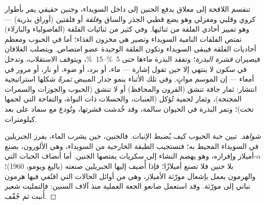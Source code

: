 \begin{definition}\label{def:b2:angiosperm-reproduction:seed}
تنقسم اللاقحة إلى معلاق يدفع الجنين إلى داخل السويداء، وجنين حقيقي
يمر بأطوار كروي وقلبي ومغزلي وهو يضع قطبي الجذر والساق و\emph{فلقة}
أو فلقتين (أوراق بذرية) --- وهو تمييز أحادي الفلقة من ثنائيها. وفي
كثير من ثنائيات الفلقة (الفاصولياء والبازلاء) تمتص الفلقات النامية
السويداء وتصير هي مخزون الغذاء؛ أما في الحبوب ومعظم أحاديات الفلقة
فيبقى السويداء وتكون الفلقة الوحيدة عضو امتصاص. ويتصلب الغلافان
فيصيران \emph{قشرة البذرة}؛ وتفقد البذرة ماءها حتى \qtyrange{5}{15}{\%}،
ويتوقف الاستقلاب، وتدخل في \emph{سكون} لا ينتهي إلا حين تقول
إشارة --- ماء، أو برد، أو ضوء، أو نار، أو مرور في أمعاء --- إن
الموسم مواتٍ. وفي تلك الأثناء ينمو جدار المبيض
\emph{ثمرةً} شكلها استراتيجية انتشار: ثمار جافة تنشق
(القرون والمحافظ) أو لا تنشق (الحبوب والجوزات والسمرات
المجنحة)، وثمار لحمية تُؤكل (العنبات، والحسلات ذات النواة،
والتفاحة التي لحمها تخت)؛ وتمر البذرة في الحيوان سالمة، وقد خُدشت
قشرتها، وتُودع مع سماد على بعد كيلومترات.
\end{definition}
\begin{proof}[شواهد]
تبين حبة الحبوب كيف يُضبط الإنبات. فالجنين، حين يشرب الماء، يفرز
الجبريلين في السويداء المحيط به؛ فتستجيب الطبقة الخارجية من
السويداء، وهي الألورون، بصنع $\alpha$-أميلاز وإفرازه، وهو يهضم
النشاء إلى سكريات يمتصها الجنين. أما أنصاف الحبات التي بلا جنين فلا
تصنع أميلازًا؛ فإذا أُضيف إليها الجبريلين صنعته (باليغ ويومو، 1960)؛
والهرمون يعمل بإشعال مورّثة الأميلاز، وهي من أوائل الحالات التي
اقتُفي فيها هرمون نباتي إلى مورّثة. وقد استعمل صانعو الجعة العملية
منذ آلاف السنين: فالتمليت شعير أُنبت ثم جُفّف.
\end{proof}

